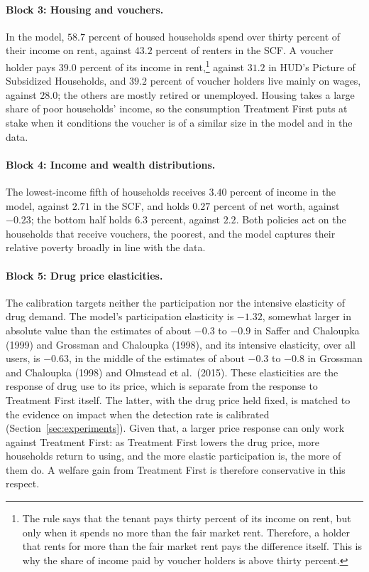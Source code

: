 \documentclass[10pt]{article}
\begin{document}
\paragraph{Block 3: Housing and vouchers.} In the model, $58.7$ percent of housed households spend over thirty percent of their income on rent, against $43.2$ percent of renters in the SCF. A voucher holder pays $39.0$ percent of its income in rent,\footnote{ The rule says that the tenant pays thirty percent of its income on rent, but only when it spends no more than the fair market rent. Therefore, a holder that rents for more than the fair market rent pays the difference itself. This is why the share of income paid by voucher holders is above thirty percent.} against $31.2$ in HUD's Picture of Subsidized Households, and $39.2$ percent of voucher holders live mainly on wages, against $28.0$; the others are mostly retired or unemployed. Housing takes a large share of poor households' income, so the consumption Treatment First puts at stake when it conditions the voucher is of a similar size in the model and in the data.

\paragraph{Block 4: Income and wealth distributions.} The lowest-income fifth of households receives $3.40$ percent of income in the model, against $2.71$ in the SCF, and holds $0.27$ percent of net worth, against $-0.23$; the bottom half holds $6.3$ percent, against $2.2$. Both policies act on the households that receive vouchers, the poorest, and the model captures their relative poverty broadly in line with the data.

\paragraph{Block 5: Drug price elasticities.} The calibration targets neither the participation nor the intensive elasticity of drug demand. The model's participation elasticity is $-1.32$, somewhat larger in absolute value than the estimates of about $-0.3$ to $-0.9$ in Saffer and Chaloupka (1999) and Grossman and Chaloupka (1998), and its intensive elasticity, over all users, is $-0.63$, in the middle of the estimates of about $-0.3$ to $-0.8$ in Grossman and Chaloupka (1998) and Olmstead et al.\ (2015). These elasticities are the response of drug use to its price, which is separate from the response to Treatment First itself. The latter, with the drug price held fixed, is matched to the evidence on impact when the detection rate is calibrated (Section~\ref{sec:experiments}). Given that, a larger price response can only work against Treatment First: as Treatment First lowers the drug price, more households return to using, and the more elastic participation is, the more of them do. A welfare gain from Treatment First is therefore conservative in this respect.
\end{document}
